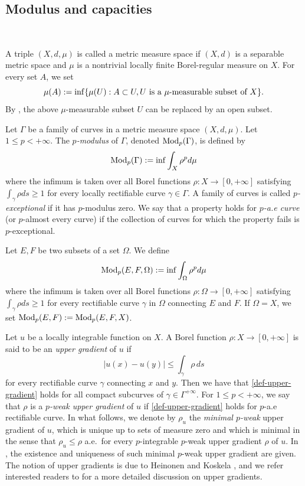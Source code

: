 \documentclass[10pt]{amsart}
\numberwithin{equation}{section}
\begin{document}
\subsection{Modulus and capacities}\label{modulus-capacity}
\ 

A triple $(X,d,\mu)$ is called a metric measure space if $(X,d)$ is a separable metric space and $\mu$ is a nontrivial locally finite Borel-regular measure on $X$. For every set $A$, we set 
 \[
 \mu(A):=\inf\{\mu(U): A\subset U, U\ \text{\rm is a $\mu$-measurable subset of $X$} \}.
 \]
 By \cite[Proposition 3.3.37]{pekka}, the above $\mu$-measurable subset $U$ can be replaced by an open subset.

 
 Let $\Gamma$ be a family of curves in a metric measure space $(X,d,\mu)$. Let $1\le p<+\infty$. The  \textit{$p$-modulus} of $\Gamma$, denoted  $\text{\rm Mod}_p(\Gamma)$, is defined by 
\[\text{\rm Mod}_p(\Gamma):=\inf \int_{X}\rho^pd\mu
\]where the infimum is taken over all Borel functions $\rho:X\to[0,{+\infty}]$ satisfying 
$\int_{\gamma}\rho ds\geq 1
$ for every locally rectifiable curve $\gamma\in\Gamma$. A family of curves is called \textit{$p$-exceptional} if it has $p$-modulus zero. We say that a property  holds for \textit{$p$-a.e curve} (or $p$-almost every curve) if the collection of curves for which the property fails  is $p$-exceptional. 

Let $E,F$ be two subsets of a set $\Omega$. We define 
\begin{equation}\label{eq2.1-0506}
\text{\rm Mod}_p(E,F,\Omega):= \inf\int_\Omega\rho^pd\mu
\end{equation}
where the infimum  is taken over all Borel functions $\rho:\Omega\to[0,+\infty]$ satisfying $\int_{\gamma}\rho ds\geq 1$ for every rectifiable curve $\gamma$ in $\Omega$ connecting $E$ and $F$. If $\Omega=X$, we set $\text{\rm Mod}_p(E,F):=\text{\rm Mod}_p(E,F,X)$.

Let $u$ be a locally integrable function on $X$. A Borel function $\rho:X\to[0,{+\infty}]$ is said to be an \textit{upper gradient} of $u$ if 
\begin{equation}
\label{def-upper-gradient}|u(x)-u(y)|\leq \int_{\gamma}\rho\, ds
\end{equation}
for every rectifiable curve $\gamma$ connecting $x$ and $y$. Then we  have that \eqref{def-upper-gradient} holds for all compact subcurves of $\gamma\in\Gamma^{+\infty}$. For $1\le p<+\infty$, we say that $\rho$ is a  \textit{$p$-weak upper gradient} of $u$ if \eqref{def-upper-gradient} holds for $p$-a.e rectifiable curve. In what follows, we denote by $\rho_u$ the  \textit{minimal $p$-weak} upper gradient of $u$, which is unique up to sets of measure zero and which is minimal in the sense that $\rho_u\leq\rho $ a.e.\ for every $p$-integrable $p$-weak upper gradient $\rho$ of $u$. In \cite{H03}, the existence and uniqueness of such  minimal $p$-weak upper gradient are given. 
The notion of upper gradients is due to Heinonen and Koskela \cite{HK98}, and we refer  interested  readers to \cite{BB15,H03,HK98,N00} for a more detailed discussion on upper gradients.
\end{document}

